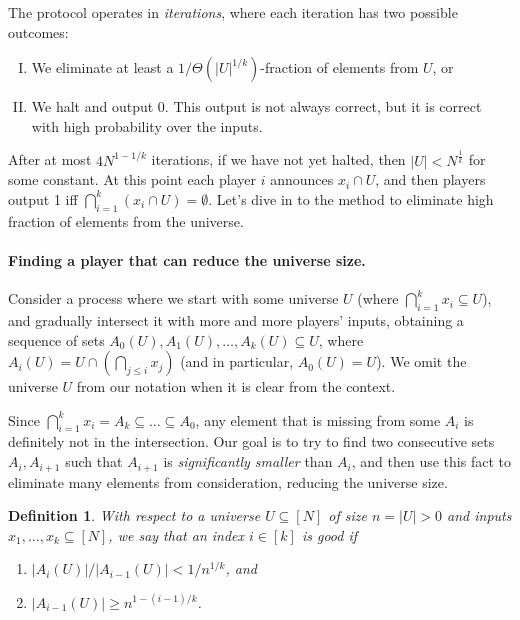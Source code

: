 \documentclass{article}
\theoremstyle{plain}
\newtheorem{definition}{Definition}
\begin{document}
The protocol operates in \emph{iterations}, where each iteration has two possible outcomes:
\begin{enumerate}[I.]
  \item We eliminate at least a $1/\Theta(|U|^{1/k})$-fraction of elements from $U$, or
  \item We halt and output 0. This output is not always correct, but it is correct with high probability over the inputs.
\end{enumerate}
After at most $4N^{1 - 1/k}$ iterations, if we have not yet halted,
then $|U| < N^{\frac{1}{k}}$ for some constant. At this point each player $i$ announces $x_i \cap U$,
and then players output 1 iff $\bigcap_{i = 1}^k (x_i \cap U) = \emptyset$. \newline
\newline
Let's dive in to the method to eliminate high fraction of elements from the universe.

\paragraph{Finding a player that can reduce the universe size.}
Consider a process where we start with some universe $U$ (where $\bigcap_{i = 1}^k x_i \subseteq U$),
and gradually intersect it with more and more players' inputs, 
obtaining a sequence of sets $A_0(U), A_1(U),\ldots,A_k(U) \subseteq U$,
where $A_i(U) = U \cap (\bigcap_{j \leq i} x_j)$ (and in particular, $A_0(U) = U$).
We omit the universe $U$ from our notation when it is clear from the context.

Since $\bigcap_{i = 1}^k x_i = A_k \subseteq \ldots \subseteq A_0$,
any element that is missing from some $A_i$ is definitely not in the intersection.
Our goal is to try to find two consecutive sets $A_i, A_{i+1}$ such that $A_{i+1}$ is \emph{significantly smaller} than $A_i$,
and then use this fact to eliminate many elements from consideration, reducing the universe size.

\begin{definition}
  With respect to a universe $U \subseteq [N]$ of size $n = |U| > 0$ and inputs $x_1,\ldots,x_k \subseteq [N]$,
  we say that an index $i \in [k]$ is \emph{good} if
  \begin{enumerate}
    \item $|A_i(U)| / |A_{i-1}(U)| < 1/n^{1/k}$, and
    \item $|A_{i-1}(U)| \geq n^{1-(i-1)/k}$.
  \end{enumerate}
  \label{def:good}
\end{definition}
\end{document}
